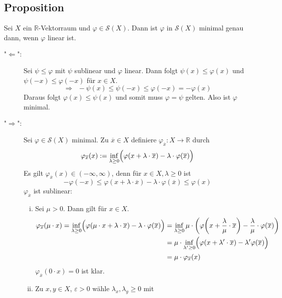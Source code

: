\subsection{Proposition} %
\label{sub:220}
Sei $X$ ein $\mathds{R}$-Vektorraum und $\varphi \in \mathcal{S}(X)$. Dann ist $\varphi$ in $\mathcal{S}(X)$ minimal genau dann, wenn $\varphi$ linear ist.
\begin{description}
	\item["$\Leftarrow$":] Sei $\psi \le \varphi$ mit $\psi$ sublinear und $\varphi$ linear. Dann folgt $\psi(x) \le \varphi(x)$ und $\psi(-x) \le \varphi(-x)$ für 
	$x \in X$.
	\[
		 \Longrightarrow \enspace- \psi(x) \le \psi(-x) \le \varphi(-x) = - \varphi(x)
	\]
	Daraus folgt $\varphi(x) \le \psi(x)$ und somit muss $\varphi=\psi$ gelten. Also ist $\varphi$ minimal.
	\item["$\Rightarrow $":] Sei $\varphi \in \mathcal{S}(X)$ minimal. Zu $\overline{x} \in X$ definiere $\varphi_{\overline{x}} : X \to \mathds{R}$ durch
	\[
		\varphi_{\overline{x}}(x) := \inf_{\lambda \ge 0} \enbrace[\Big]{\varphi \enbrace*{x+ \lambda \cdot \overline{x} } - \lambda \cdot \varphi(\overline{x})}
	\]
	Es gilt $\varphi_{\overline{x}}(x) \in (-\infty,\infty)$, denn für $x \in X, \lambda \ge 0$ ist 
	\[
		-\varphi(-x) \le \varphi(x+ \lambda \cdot \overline{x}) - \lambda  \cdot \varphi(\overline{x}) \le \varphi(x)
	\]
	$\varphi_{\overline{x}}$ ist sublinear:
	\begin{enumerate}[(i)]
		\item Sei $\mu >0$. Dann gilt für $x \in X$.
		\begin{align*}
			\varphi_{\overline{x}}(\mu \cdot x) = \inf_{\lambda \ge 0} \enbrace[\Big]{ \varphi \enbrace*{\mu \cdot x + \lambda  \cdot \overline{x} } 
			- \lambda \cdot \varphi(\overline{x} )} &= \inf_{\lambda \ge 0 } \mu \cdot  \enbrace*{ \varphi \enbrace*{x + \frac{\lambda }{\mu} \cdot \overline{x}}
			- \frac{\lambda }{\mu} \cdot \varphi(\overline{x} )  } \\
			&= \mu \cdot \inf_{\lambda' \ge 0} \enbrace[\Big]{ \varphi \enbrace*{x+ \lambda' \cdot \overline{x} } - \lambda' \varphi(\overline{x})} \\
			&= \mu \cdot \varphi_{\overline{x}}(x) 
		\end{align*}
		$\varphi_{\overline{x}}(0 \cdot x) = 0$ ist klar.
		\item Zu $x,y \in X$, $\varepsilon>0$ wähle $\lambda_x, \lambda_y \ge 0$ mit 
		\begin{align*}

\end{align*}
\end{enumerate}
\end{description}
